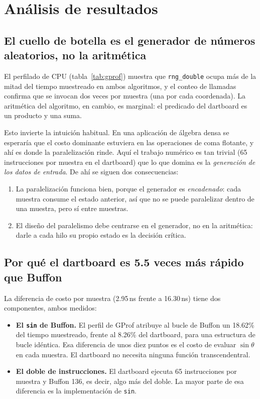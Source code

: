 \section{Análisis de resultados}

\subsection{El cuello de botella es el generador de números aleatorios, no la aritmética}

El perfilado de CPU (tabla~\ref{tab:gprof}) muestra que \texttt{rng\_double} ocupa más de la mitad del tiempo muestreado en ambos algoritmos, y el conteo de llamadas confirma que se invocan dos veces por muestra (una por cada coordenada). La aritmética del algoritmo, en cambio, es marginal: el predicado del dartboard es un producto y una suma.

Esto invierte la intuición habitual. En una aplicación de álgebra densa se esperaría que el costo dominante estuviera en las operaciones de coma flotante, y ahí es donde la paralelización rinde. Aquí el trabajo numérico es tan trivial (65 instrucciones por muestra en el dartboard) que lo que domina es la \emph{generación de los datos de entrada}. De ahí se siguen dos consecuencias:

\begin{enumerate}
    \item La paralelización funciona bien, porque el generador es \emph{encadenado}: cada muestra consume el estado anterior, así que no se puede paralelizar dentro de una muestra, pero sí entre muestras.
    \item El diseño del paralelismo debe centrarse en el generador, no en la aritmética: darle a cada hilo su propio estado es la decisión crítica.
\end{enumerate}

\subsection{Por qué el dartboard es 5.5 veces más rápido que Buffon}

La diferencia de costo por muestra (2.95\,ns frente a 16.30\,ns) tiene dos componentes, ambos medidos:

\begin{itemize}
    \item \textbf{El \texttt{sin} de Buffon.} El perfil de GProf atribuye al bucle de Buffon un 18.62\% del tiempo muestreado, frente al 8.26\% del dartboard, para una estructura de bucle idéntica. Esa diferencia de unos diez puntos es el costo de evaluar $\sin\theta$ en cada muestra. El dartboard no necesita ninguna función transcendentral.
    \item \textbf{El doble de instrucciones.} El dartboard ejecuta 65 instrucciones por muestra y Buffon 136, es decir, algo más del doble. La mayor parte de esa diferencia es la implementación de \texttt{sin}.
\end{itemize}

